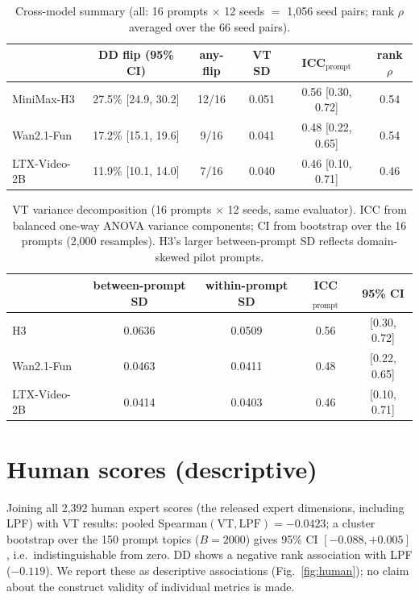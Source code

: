 \documentclass[10pt,twocolumn]{article}
\begin{document}
\begin{table}[t]
\centering\small
\begin{tabular}{lccccc}
\toprule
 & DD flip (95\% CI) & any-flip & VT SD & ICC$_{\text{prompt}}$ & rank $\rho$\\
\midrule
MiniMax-H3   & 27.5\% [24.9, 30.2] & 12/16 & 0.051 & 0.56 [0.30, 0.72] & 0.54\\
Wan2.1-Fun   & 17.2\% [15.1, 19.6] & 9/16 & 0.041 & 0.48 [0.22, 0.65] & 0.54\\
LTX-Video-2B & 11.9\% [10.1, 14.0] & 7/16 & 0.040 & 0.46 [0.10, 0.71] & 0.46\\
\bottomrule
\end{tabular}
\caption{Cross-model summary (all: 16 prompts $\times$ 12 seeds $=$ 1{,}056 seed
pairs; rank $\rho$ averaged over the 66 seed pairs).}
\label{tab:e5}
\end{table}
\begin{table}[t]
\centering\small
\begin{tabular}{lcccc}
\toprule
 & between-prompt SD & within-prompt SD & ICC$_{\text{prompt}}$ & 95\% CI\\
\midrule
H3           & 0.0636 & 0.0509 & 0.56 & [0.30, 0.72]\\
Wan2.1-Fun   & 0.0463 & 0.0411 & 0.48 & [0.22, 0.65]\\
LTX-Video-2B & 0.0414 & 0.0403 & 0.46 & [0.10, 0.71]\\
\bottomrule
\end{tabular}
\caption{VT variance decomposition (16 prompts $\times$ 12 seeds, same evaluator). ICC from balanced one-way ANOVA variance components; CI from bootstrap over the 16 prompts (2{,}000 resamples). H3's larger between-prompt SD reflects domain-skewed pilot prompts.}
\label{tab:icc}
\end{table}

\section{Human scores (descriptive)}\label{sec:human}
Joining all 2{,}392 human expert scores (the released expert dimensions,
including LPF) with VT results: pooled
Spearman$(\text{VT}, \text{LPF}) = -0.0423$; a cluster bootstrap over the 150
prompt topics ($B{=}2000$) gives 95\% CI $[-0.088, +0.005]$, i.e.\
indistinguishable from zero. DD shows a negative rank association with LPF
($-0.119$). We report these as descriptive associations (Fig.~\ref{fig:human}); no claim
about the construct validity of individual metrics is made.
\end{document}
